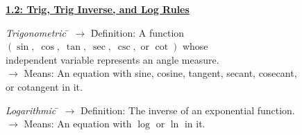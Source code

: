 \textbf{\underline{\large{1.2: Trig, Trig Inverse, and Log Rules}}} \par

\begin{tcolorbox}[definition]
    \begin{tabbing}
        \textit{Trigonometric} \= $\rightarrow$ \= Definition: A function $(\sin, \; \cos, \; \tan, \; \sec, \; \csc, \text{ or } \cot)$ whose \\ 
        \> \> independent variable represents an angle measure. \\[5.5pt]
        \> $\rightarrow$ Means: An equation with sine, cosine, tangent, secant, cosecant, \\ 
        \> \> or cotangent in it.
    \end{tabbing} \vspace{11pt}
    \begin{tabbing}
        \textit{Logarithmic} \= $\rightarrow$ Definition: The inverse of an exponential function. \\[5.5pt]
        \> $\rightarrow$ Means: An equation with $\log$ or $\ln$ in it.
    \end{tabbing}
\end{tcolorbox}

\begin{center}
\end{center}
\begin{center}
\end{center}

